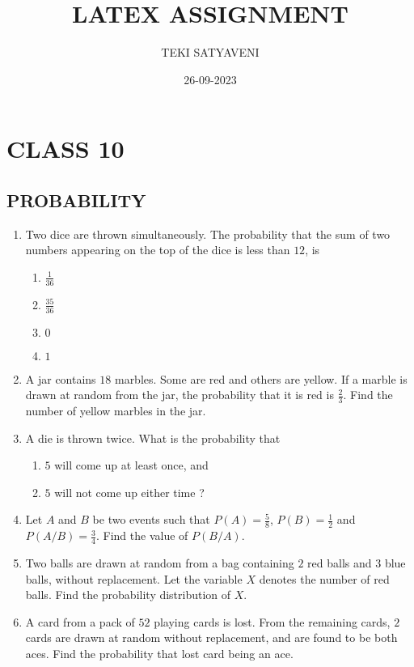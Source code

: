 \documentclass{article}
\theoremstyle{remark}
\begin{document}
\title{LATEX ASSIGNMENT}
\author{TEKI SATYAVENI}
\date{26-09-2023}
\maketitle
\section*{CLASS 10} 
\date{}
\centering
\subsection*{PROBABILITY}


\begin{enumerate}[label=\arabic*.,ref=\theenumi]
\item Two dice are thrown simultaneously. The probability that the sum of two numbers appearing on the top of the dice is less than $12$, is
 \begin{enumerate}
        \item $\frac{1}{36}$
        \item $\frac{35}{36}$
        \item $0$
        \item $1$
    \end{enumerate}

\item A jar contains $18$ marbles. Some are red and others are yellow. If a 
marble is drawn at random from the jar, the probability that it is red is $\frac{2}{3}$. Find the number of yellow marbles in the jar.

\item A die is thrown twice. What is the probability that 
\begin{enumerate}[label=(\roman*)]
 \item $5$ will come up at least once, and 
 \item $5$ will not come up either time ? 
\end{enumerate}

\item Let $A$ and $B$ be two events such that $P(A)=\frac{5}{8}$, $P(B)=\frac{1}{2}$ and $P(A/B)=\frac{3}{4}$. Find the value of $P(B/A)$.

\item Two balls are drawn at random from a bag containing $2$ red balls and $3$ blue balls, without replacement. Let the variable $X$ denotes the number of red balls. Find the probability distribution of $X$.

\item A card from a pack of $52$ playing cards is lost. From the remaining cards, $2$ cards are drawn at random without replacement, and are found to be both aces. Find the probability that lost card being an ace.


\end{enumerate}
\end{document}
